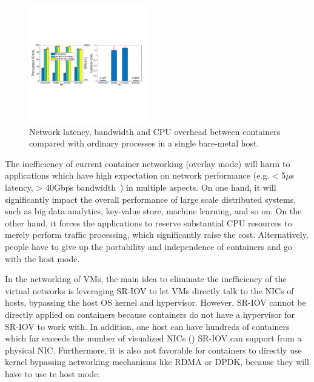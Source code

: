 \begin{figure}[t!]
     \centering 
     \includegraphics[width=0.46\textwidth]{figures/intro/intro_exist2.pdf} 
     \caption{Network latency, bandwidth and CPU overhead between containers compared with ordinary processes in a single bare-metal host. }
     \label{fig:intro-exist}
\end{figure} 

The inefficiency of current container networking (overlay mode) 
will harm to applications which have high expectation  on network performance (e.g. < 5$\mu$s latency, > 40Gbps bandwidth~\cite{?}) in multiple aspects. 
On one hand,
it will significantly impact the overall performance of large scale distributed systems, such as big data analytics, key-value store, machine learning, and so on. On the other hand, it forces the applications to reserve substantial CPU
resources to merely perform traffic processing, which significantly raise the 
cost. Alternatively, people have to give up the portability and independence
of containers and go with the host mode. 

In the networking of VMs, the main idea to eliminate the inefficiency of the virtual networks is leveraging SR-IOV to let VMs directly talk to the NICs of
hosts, bypassing the host OS kernel and hypervisor. 
However, SR-IOV cannot be directly applied on containers because containers 
do not have a hypervisor for SR-IOV to work with. In addition, one host can have
hundreds of containers which far exceeds the number of visualized NICs () SR-IOV can support from a physical NIC. Furthermore, it is also not
favorable for containers to directly use kernel bypassing networking mechanisms like RDMA or DPDK, because they will have to use te host mode. 

